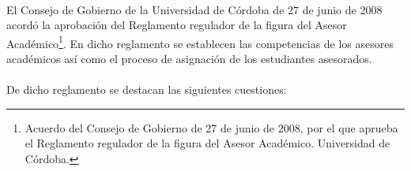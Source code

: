 \paragraph{}El Consejo de Gobierno de la Universidad de Córdoba de 27 de junio
de 2008 acordó la aprobación del Reglamento regulador de la figura del Asesor
Académico\footnote{Acuerdo del Consejo de Gobierno de 27 de junio de 2008, por
el que aprueba el Reglamento regulador de la figura del Asesor
Académico. Universidad de Córdoba.}. En dicho reglamento se establecen las
competencias de los asesores académicos así como el proceso de asignación de los
estudiantes asesorados.

\paragraph{}De dicho reglamento se destacan las siguientes cuestiones:

